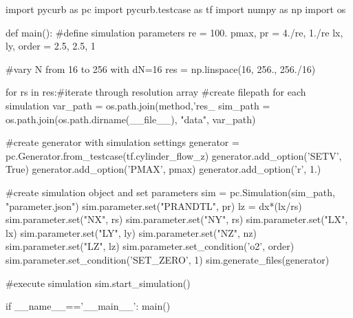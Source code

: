 \begin{python}[caption='Grid Convergence Study Example', label={gcstudy_papi}]
import pycurb as pc
import pycurb.testcase as tf
import numpy as np
import os

def main():
    #define simulation parameters
    re = 100.
    pmax, pr = 4./re,  1./re
    lx, ly, order = 2.5, 2.5, 1

    #vary N from 16 to 256 with dN=16
    res = np.linspace(16, 256., 256./16)

    for rs in res:#iterate through resolution array
        #create filepath for each simulation
        var_path = os.path.join(method,'res_%
        sim_path = os.path.join(os.path.dirname(__file__), "data", var_path)

        #create generator with simulation settings
        generator = pc.Generator.from_testcase(tf.cylinder_flow_z)
        generator.add_option('SETV', True)
        generator.add_option('PMAX', pmax)
        generator.add_option('r', 1.)

        #create simulation object and set parameters
        sim = pc.Simulation(sim_path, "parameter.json")
        sim.parameter.set("PRANDTL", pr)
        lz = dx*(lx/rs)
        sim.parameter.set("NX", rs)
        sim.parameter.set("NY", rs)
        sim.parameter.set("LX", lx)
        sim.parameter.set("LY", ly)
        sim.parameter.set("NZ", nz)
        sim.parameter.set("LZ", lz)
        sim.parameter.set_condition('o2', order)
        sim.parameter.set_condition('SET_ZERO', 1)
        sim.generate_files(generator)

        #execute simulation
        sim.start_simulation()

if __name__=='__main__':
    main()
\end{python}

